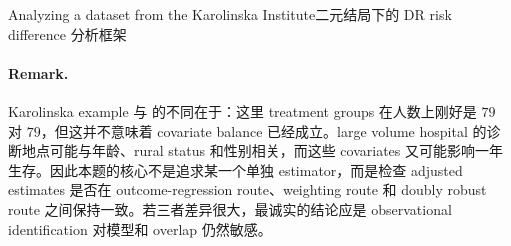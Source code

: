 \begin{exercisesolution}{Analyzing a dataset from the Karolinska Institute}{二元结局下的 DR risk difference 分析框架}
\paragraph{Remark.}
Karolinska example 与  的不同在于：这里 treatment groups 在人数上刚好是 $79$ 对 $79$，但这并不意味着 covariate balance 已经成立。large volume hospital 的诊断地点可能与年龄、rural status 和性别相关，而这些 covariates 又可能影响一年生存。因此本题的核心不是追求某一个单独 estimator，而是检查 adjusted estimates 是否在 outcome-regression route、weighting route 和 doubly robust route 之间保持一致。若三者差异很大，最诚实的结论应是 observational identification 对模型和 overlap 仍然敏感。
\end{exercisesolution}
